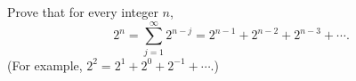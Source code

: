 Prove that for every integer $n$,
\[
2^n=\sum_{j=1}^{\infty}2^{n-j}=2^{n-1}+2^{n-2}+2^{n-3}+\cdots .
\]
(For example, $2^2=2^1+2^0+2^{-1}+\cdots$.)
